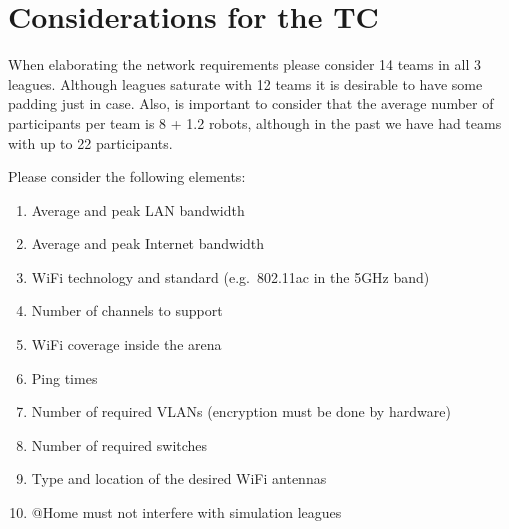 \documentclass[11pt, twoside, openright, a4paper, chapterprefix]{scrbook}
\begin{document}


\chapter{Considerations for the TC}
When elaborating the network requirements please consider 14 teams in all 3 leagues.
Although leagues saturate with 12 teams it is desirable to have some padding just in case.
Also, is important to consider that the average number of participants per team is 8 + 1.2 robots, although in the past we have had teams with up to 22 participants.


Please consider the following elements:
\begin{enumerate}
	\item Average and peak LAN bandwidth
	\item Average and peak Internet bandwidth
	\item WiFi technology and standard (e.g.~802.11ac in the 5GHz band)
	\item Number of channels to support
	\item WiFi coverage inside the arena
	\item Ping times
	\item Number of required VLANs (encryption must be done by hardware)
	\item Number of required switches
	\item Type and location of the desired WiFi antennas
	\item @Home must not interfere with simulation leagues
\end{enumerate}


\end{document}

